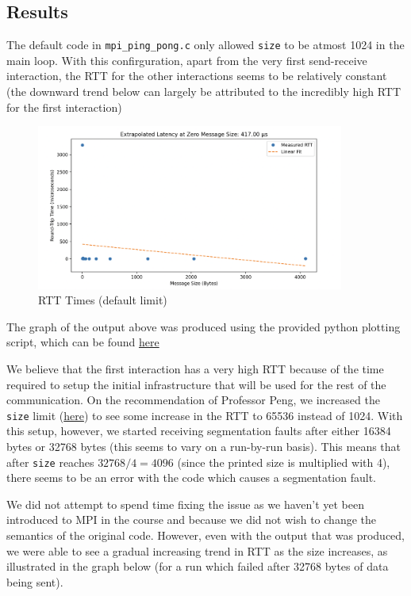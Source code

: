 \documentclass[a4paper,10pt]{article}
\begin{document}
\subsection{Results}
The default code in \verb|mpi_ping_pong.c| only allowed \verb|size| to be atmost 1024 in the main loop. With this confirguration, apart from the very first send-receive interaction, the RTT for the other interactions seems to be relatively constant (the downward trend below can largely be attributed to the incredibly high RTT for the first interaction)

  \begin{figure}[H]
    \centering
    \includegraphics[width=0.9\textwidth]{img/bonus_lim1024}
    \caption{RTT Times (default limit)}
    \label{fig:bonus_rtt_default}
  \end{figure}
  
The graph of the output above was produced using the provided python plotting script, which can be found \href{https://github.com/paulmyr/DD2356-MethodsHPC/blob/master/2_hpc_arch_perf_model/bonus/graph_latency.py}{here}

We believe that the first interaction has a very high RTT because of the time required to setup the initial infrastructure that will be used for the rest of the communication. On the recommendation of Professor Peng, we increased the \verb|size| limit (\href{https://github.com/paulmyr/DD2356-MethodsHPC/blob/master/2_hpc_arch_perf_model/bonus/mpi_ping_pong.c#L14}{here}) to see some increase in the RTT to 65536 instead of 1024. With this setup, however, we started receiving segmentation faults after either 16384 bytes or 32768 bytes (this seems to vary on a run-by-run basis). This means that after \verb|size| reaches $32768 / 4 = 4096$ (since the printed size is multiplied with 4), there seems to be an error with the code which causes a segmentation fault. 

We did not attempt to spend time fixing the issue as we haven't yet been introduced to MPI in the course and because we did not wish to change the semantics of the original code. However, even with the output that was produced, we were able to see a gradual increasing trend in RTT as the size increases, as illustrated in the graph below (for a run which failed after 32768 bytes of data being sent). 
\end{document}
